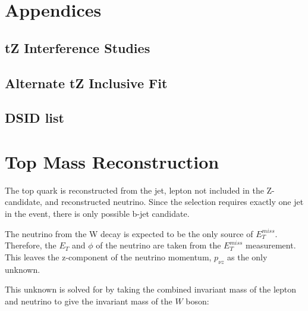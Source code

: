 \documentclass[NOTE, atlasdraft=true, texlive=2016, UKenglish]{\ATLASLATEXPATH atlasdoc}
\begin{document}


\clearpage
\appendix
\section*{Appendices}

\subsection{tZ Interference Studies}
\label{sec:tZInt}


\subsection{Alternate tZ Inclusive Fit}
\label{sec:inc_tZ}


\subsection{DSID list}
\label{sec:dsid_list}


\iffalse
\section*{Top Mass Reconstruction}
\label{sec:topMass}

The top quark is reconstructed from the jet, lepton not included in the Z-candidate, and reconstructed neutrino. Since the selection requires exactly one jet in the event, there is only possible b-jet candidate. 

The neutrino from the W decay is expected to be the only source of $E_T^{miss}$. Therefore, the $E_T$ and $\phi$ of the neutrino are taken from the $E_T^{miss}$ measurement. This leaves the z-component of the neutrino momentum, $p_{\nu z}$ as the only unknown. 

This unknown is solved for by taking the combined invariant mass of the lepton and neutrino to give the invariant mass of the $W$ boson:
\end{document}
